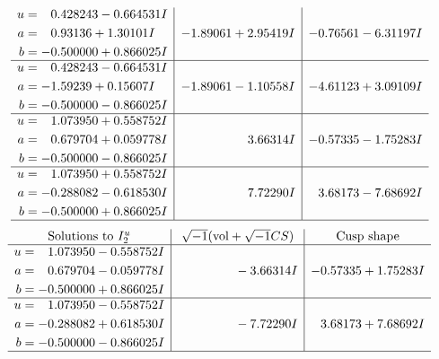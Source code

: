\documentclass[1p]{elsarticle_modified}
\theoremstyle{definition}
\newcommand{\I}{\sqrt{-1}}
\begin{document}
$$\begin{array}{c|c|c}
\begin{aligned}
u &= \phantom{-}0.428243 - 0.664531 I \\
a &= \phantom{-}0.93136 + 1.30101 I \\
b &= -0.500000 + 0.866025 I\end{aligned}
 & -1.89061 + 2.95419 I & -0.76561 - 6.31197 I \\ \hline\begin{aligned}
u &= \phantom{-}0.428243 - 0.664531 I \\
a &= -1.59239 + 0.15607 I \\
b &= -0.500000 - 0.866025 I\end{aligned}
 & -1.89061 - 1.10558 I & -4.61123 + 3.09109 I \\ \hline\begin{aligned}
u &= \phantom{-}1.073950 + 0.558752 I \\
a &= \phantom{-}0.679704 + 0.059778 I \\
b &= -0.500000 - 0.866025 I\end{aligned}
 & \phantom{-0.000000 -}3.66314 I & -0.57335 - 1.75283 I \\ \hline\begin{aligned}
u &= \phantom{-}1.073950 + 0.558752 I \\
a &= -0.288082 - 0.618530 I \\
b &= -0.500000 + 0.866025 I\end{aligned}
 & \phantom{-0.000000 -}7.72290 I & \phantom{-}3.68173 - 7.68692 I\\
 \hline 
 \end{array}$$\newpage$$\begin{array}{c|c|c}  
\text{Solutions to }I^u_{2}& \I (\text{vol} + \sqrt{-1}CS) & \text{Cusp shape}\\
 \hline 
\begin{aligned}
u &= \phantom{-}1.073950 - 0.558752 I \\
a &= \phantom{-}0.679704 - 0.059778 I \\
b &= -0.500000 + 0.866025 I\end{aligned}
 & \phantom{-0.000000 } -3.66314 I & -0.57335 + 1.75283 I \\ \hline\begin{aligned}
u &= \phantom{-}1.073950 - 0.558752 I \\
a &= -0.288082 + 0.618530 I \\
b &= -0.500000 - 0.866025 I\end{aligned}
 & \phantom{-0.000000 } -7.72290 I & \phantom{-}3.68173 + 7.68692 I\\
 \hline 
 \end{array}$$\newpage
\end{document}
